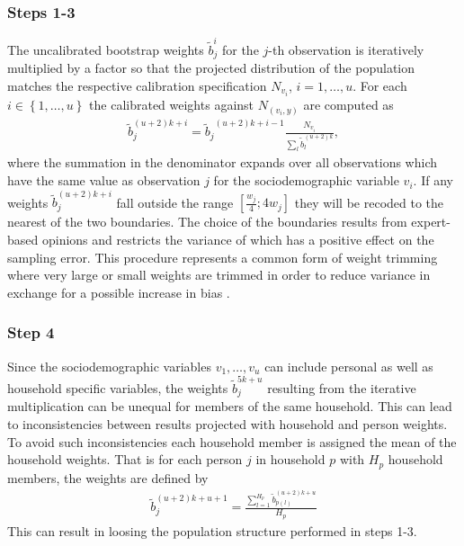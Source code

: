 \documentclass{scrartcl}
\begin{document}
\subsubsection{Steps 1-3}
The uncalibrated bootstrap weights $\tilde{b}_j^{i}$ for the $j$-th observation is iteratively multiplied by a factor so that the projected distribution of the population matches the respective calibration specification $N_{v_i}$, $i=1,\ldots,u$.
For each $i \in \left\{1,\ldots,u\right\}$ the calibrated weights against $N_{(v_i,y)}$ are computed as
\begin{align*}
  \tilde{b}_j^{(u+2)k+i} = {\tilde{b}_j}^{(u+2)k+i-1}\frac{N_{v_i}}{{\sum\limits_l} {\tilde{b}}_l^{(u+2)k}},
\end{align*}
where the summation in the denominator expands over all observations which have the same value as observation $j$ for the sociodemographic variable $v_i$.
If any weights $\tilde{b}_j^{(u+2)k+i}$ fall outside the range $\left[\frac{w_j}{4};4w_j\right]$ they will be recoded to the nearest of the two boundaries. The choice of the boundaries results from expert-based opinions and restricts the variance of which has a positive effect on the sampling error. This procedure represents a common form of weight trimming where very large or small weights are trimmed in order to reduce variance in exchange for a possible increase in bias \citep{potter90,potter93}.

\subsubsection{Step 4}
Since the sociodemographic variables $v_1,\ldots,v_u$ can include personal as well as household specific variables, the weights $\tilde{b}_j^{5k+u}$   resulting from the iterative multiplication can be unequal for members of the same household. This can lead to inconsistencies between results projected with household and person weights. To avoid such inconsistencies each household member is assigned the mean of the household weights. That is for each person $j$ in household $p$ with $H_p$ household members, the weights are defined by
\begin{align*}
  \tilde{b}_j^{(u+2)k+u+1} = \frac{{\sum\limits_{l=1}^{H_p}} {\tilde{b}}_{p(l)}^{(u+2)k+u}}{H_p}
\end{align*}
This can result in loosing the population structure performed in steps 1-3.
\end{document}
